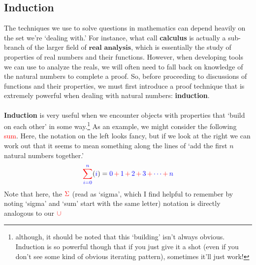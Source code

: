 \documentclass[10pt]{article}
\theoremstyle{definition}
\begin{document}
{\subsection{Induction}
The techniques we use to solve questions in mathematics can depend
heavily on the set we're `dealing with.'  For instance, what call
\textbf{calculus} is actually a sub-branch of the larger field of
$\textbf{real analysis}$, which is essentially the study of properties
of real numbers and their functions.  However, when developing tools
we can use to analyze the reals, we will often need to fall back on
knowledge of the natural numbers to complete a proof.  So, before
proceeding to discussions of functions and their properties, we must
first introduce a proof technique that is extremely powerful when
dealing with natural numbers: \textbf{induction}.\\~\\
\textbf{Induction} is very useful when we encounter objects with
properties that `build on each other' in some way.\footnote{although,
  it should be noted that this `building' isn't always obvious.
  Induction is so powerful though that if you just give it a shot
  (even if you don't see some kind of obvious iterating pattern),
  sometimes it'll just work!}  As an example, we might consider the
following \textcolor{red}{sum}.  Here, the notation on the left looks
fancy, but if we look at the right we can work out that it seems to
mean something along the lines of `add the first $n$ natural numbers
together.'  %
\[{\color{red}\sum^{{\color{blue}n}}_{\color{blue} i=0}}
  ({\color{blue}i}) = \textcolor{blue}{0}
  \,{\color{red}+}\,\textcolor{blue}{1} \,{\color{red}+}\,
  \textcolor{blue}{2} \,{\color{red}+}\, \textcolor{blue}{3}
  \,{\color{red}+}\, \textcolor{blue}{\cdots} \,{\color{red}+}\,
  \textcolor{blue}{n}\]
Note that here, the $\color{red}\Sigma$ (read as `sigma', which I find
helpful to remember by noting `sigma' and `sum' start with the same
letter) notation is directly analogous to our $\color{red}\cup$
}
\end{document}
